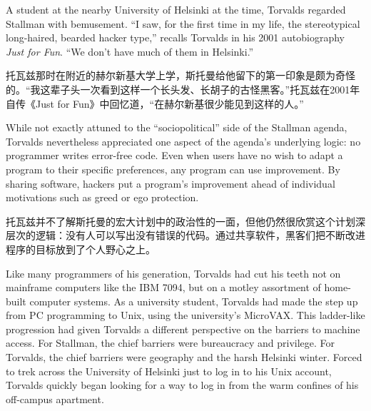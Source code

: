 \ifdefined\eng
A student at the nearby University of Helsinki at the time, Torvalds regarded Stallman with bemusement. ``I saw, for the first time in my life, the stereotypical long-haired, bearded hacker type,'' recalls Torvalds in his 2001 autobiography \textit{Just for Fun}. ``We don't have much of them in Helsinki.''
\fi

\ifdefined\chs
托瓦兹那时在附近的赫尔新基大学上学，斯托曼给他留下的第一印象是颇为奇怪的。“我这辈子头一次看到这样一个长头发、长胡子的古怪黑客。”托瓦兹在2001年自传《Just for Fun》中回忆道，“在赫尔新基很少能见到这样的人。”
\fi

\ifdefined\eng
While not exactly attuned to the ``sociopolitical'' side of the Stallman agenda, Torvalds nevertheless appreciated one aspect of the agenda's underlying logic: no programmer writes error-free code. Even when users have no wish to adapt a program to their specific preferences, any program can use improvement. By sharing software, hackers put a program's improvement ahead of individual motivations such as greed or ego protection.
\fi

\ifdefined\chs
托瓦兹并不了解斯托曼的宏大计划中的政治性的一面，但他仍然很欣赏这个计划深层次的逻辑：没有人可以写出没有错误的代码。通过共享软件，黑客们把不断改进程序的目标放到了个人野心之上。
\fi

\ifdefined\eng
Like many programmers of his generation, Torvalds had cut his teeth not on mainframe computers like the IBM 7094, but on a motley assortment of home-built computer systems. As a university student, Torvalds had made the step up from PC programming to Unix, using the university's MicroVAX. This ladder-like progression had given Torvalds a different perspective on the barriers to machine access. For Stallman, the chief barriers were bureaucracy and privilege. For Torvalds, the chief barriers were geography and the harsh Helsinki winter. Forced to trek across the University of Helsinki just to log in to his Unix account, Torvalds quickly began looking for a way to log in from the warm confines of his off-campus apartment.
\fi

